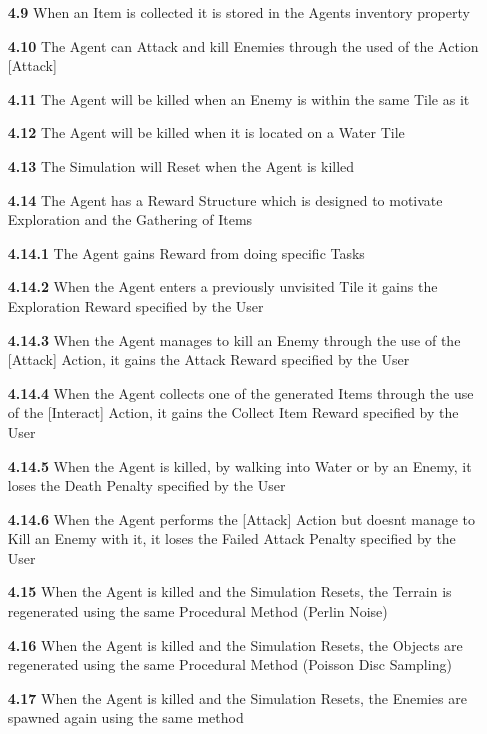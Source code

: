 \begin{flushleft}
\begin{itemize}
            \item[\textbf{4.9}] When an Item is collected it is stored in the Agents \textsf{inventory} property
            \item[\textbf{4.10}] The Agent can Attack and kill Enemies through the used of the Action [Attack]
            \item[\textbf{4.11}] The Agent will be killed when an Enemy is within the same Tile as it
            \item[\textbf{4.12}] The Agent will be killed when it is located on a Water Tile
            \item[\textbf{4.13}] The Simulation will Reset when the Agent is killed
            \item[\textbf{4.14}] The Agent has a Reward Structure which is designed to motivate Exploration and the Gathering of Items 
            \item[\textbf{4.14.1}] The Agent gains Reward from doing specific Tasks
            \item[\textbf{4.14.2}] When the Agent enters a previously unvisited Tile it gains the Exploration Reward specified by the User
            \item[\textbf{4.14.3}] When the Agent manages to kill an Enemy through the use of the [Attack] Action, it gains the Attack Reward specified by the User
            \item[\textbf{4.14.4}] When the Agent collects one of the generated Items through the use of the [Interact] Action, it gains the Collect Item Reward specified by the User
            \item[\textbf{4.14.5}] When the Agent is killed, by walking into Water or by an Enemy, it loses the Death Penalty specified by the User
            \item[\textbf{4.14.6}] When the Agent performs the [Attack] Action but doesnt manage to Kill an Enemy with it, it loses the Failed Attack Penalty specified by the User
            \item[\textbf{4.15}] When the Agent is killed and the Simulation Resets, the Terrain is regenerated using the same Procedural Method (Perlin Noise)
            \item[\textbf{4.16}] When the Agent is killed and the Simulation Resets, the Objects are regenerated using the same Procedural Method (Poisson Disc Sampling)
            \item[\textbf{4.17}] When the Agent is killed and the Simulation Resets, the Enemies are spawned again using the same method

\end{itemize}
\end{flushleft}
